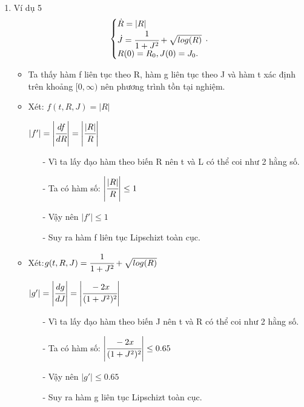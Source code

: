 \documentclass[a4paper]{article}
\begin{document}
\begin{enumerate}
        \item Ví dụ 5 
        \begin{equation*}
            \left\{\begin{array}{@{}l@{}}
        \dot{R} = \left|R\right|\\
        \dot{J} =  \cfrac{1}{1+J^2}+\sqrt{log(R)}\\
        R(0) = R_{0}, J(0) = J_{0}.
        \end{array}\right.\,.
        \end{equation*}
        
        \begin{itemize}
            \item Ta thấy hàm f liên tục theo R, hàm g liên tục theo J và hàm t xác định trên khoảng $[0,\infty)$ nên phương trình tồn tại nghiệm.
            \item Xét: $f(t,R,J) = |R|$ 
            \begin{center}
                $|f'| = \left|\cfrac{df}{dR}\right| = \left|\cfrac{|R|}{R}\right| $\\
            \end{center}
            \begin{itemize}
                \item[-] Vì ta lấy đạo hàm theo biến R nên t và L có thể coi như 2 hằng số.
                \item[-] Ta có hàm số: $\left|\cfrac{|R|}{R}\right| \leq 1$
                \item[-] Vậy nên $\left|f'\right| \leq 1$
                \item[-] Suy ra hàm f liên tục Lipschizt toàn cục.
            \end{itemize}
            \item Xét:$g(t,R,J) = \cfrac{1}{1+J^2}+\sqrt{log(R)}$
            \begin{center}
                $\left|g'\right| = \left|\cfrac{dg}{dJ}\right| = \left|\cfrac{-2x}{(1+J^2)^2}\right|$\\
            \end{center}
            \begin{itemize}
                \item[-] Vì ta lấy đạo hàm theo biến J nên t và R có thể coi như 2 hằng số.
                \item[-] Ta có hàm số: $\left|\cfrac{-2x}{(1+J^2)^2}\right| \leq 0.65$
                \item[-] Vậy nên $|g'| \leq 0.65$
                \item[-] Suy ra hàm g liên tục Lipschizt toàn cục.
            \end{itemize}
        \end{itemize}
\end{enumerate}
\newpage
\end{document}

